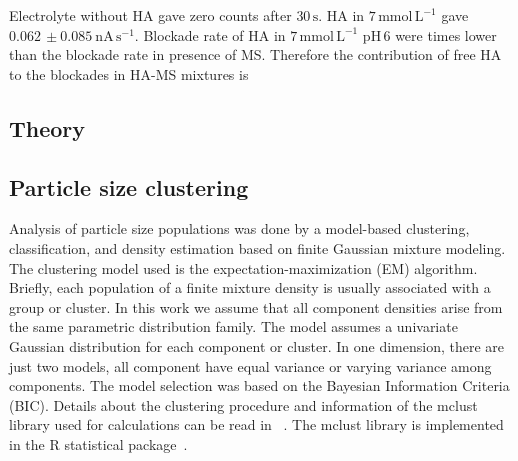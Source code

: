 \documentclass[journal=langd5,manuscript=article]{achemso}
\begin{document}


Electrolyte without HA gave zero counts after $\mathrm{30\,s}$.
HA in  $\mathrm{7\, mmol\,L^{-1}}$ gave $0.062\,\pm0.085~\mathrm{nA\,s^{-1}}$.
Blockade rate of HA in  $\mathrm{7\, mmol\,L^{-1}}$
$\mathrm{pH}\,6$ were 
times lower than the blockade rate in presence of MS. Therefore the contribution of free HA to the blockades in  HA-MS mixtures is %






\subsection{Theory}









\subsection{Particle size clustering}

Analysis of particle size populations was done by    
a model-based clustering, classification, and density estimation based on
finite Gaussian mixture modeling.  The clustering model used is the 
expectation-maximization (EM) algorithm. 
Briefly, each population of a finite  mixture density is usually associated with a group or cluster. In this work we assume that all component densities arise from the same parametric distribution family. The model assumes a univariate Gaussian distribution for each component or cluster. In one dimension, there are just two models, all component have equal variance or varying variance among components.
The model selection was based on the Bayesian Information Criteria (BIC).
Details about the clustering procedure and information of the mclust library used for calculations can be read in 
~\citeauthor{Fraley2012MclustEstimation}\cite{Fraley2012MclustEstimation}. The mclust library is implemented in the R statistical package~\cite{RCoreTeam2011}.
\end{document}
